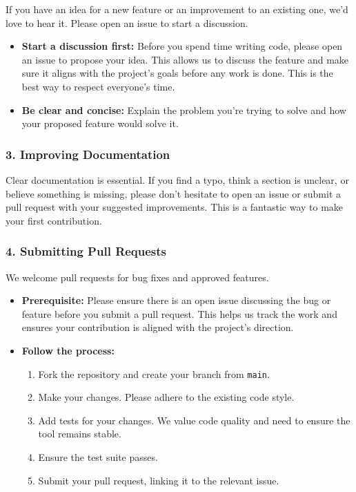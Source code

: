 \documentclass[11pt, a4paper]{article}
\begin{document}
If you have an idea for a new feature or an improvement to an existing one, we'd love to hear it.
Please open an issue to start a discussion.

\begin{itemize}[leftmargin=*]
    \item \textbf{Start a discussion first:} Before you spend time writing code, please open an issue to propose your idea.
    This allows us to discuss the feature and make sure it aligns with the project's goals before any work is done.
    This is the best way to respect everyone's time.
    \item \textbf{Be clear and concise:} Explain the problem you're trying to solve and how your proposed feature would solve it.
\end{itemize}

\subsubsection*{3. Improving Documentation}

Clear documentation is essential.
If you find a typo, think a section is unclear, or believe something is missing, please don't hesitate to open an issue or submit a pull request with your suggested improvements. This is a fantastic way to make your first contribution.

\subsubsection*{4. Submitting Pull Requests}

We welcome pull requests for bug fixes and approved features.

\begin{itemize}[leftmargin=*]
    \item \textbf{Prerequisite:} Please ensure there is an open issue discussing the bug or feature before you submit a pull request. This helps us track the work and ensures your contribution is aligned with the project's direction.
    \item \textbf{Follow the process:}
        \begin{enumerate}
            \item Fork the repository and create your branch from \texttt{main}.
            \item Make your changes. Please adhere to the existing code style.
            \item Add tests for your changes. We value code quality and need to ensure the tool remains stable.
            \item Ensure the test suite passes.
            \item Submit your pull request, linking it to the relevant issue.
        \end{enumerate}
\end{itemize}
\end{document}
